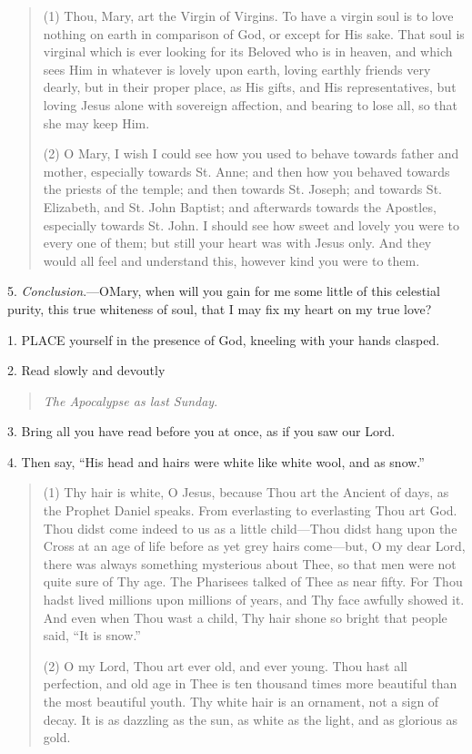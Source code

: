 \begin{quote}

(1) Thou, Mary, art the Virgin
of Virgins. To have a virgin soul is to love nothing on earth in
comparison of God, or except for His sake. That soul is virginal which
is ever looking for its Beloved who is in heaven, and which sees Him
in whatever is lovely upon earth, loving earthly friends very dearly,
but in their proper place, as His gifts, and His representatives, but
loving Jesus alone with sovereign affection, and bearing to lose all,
so that she may keep Him.

(2) O Mary, I wish I could see
how you used to behave towards father and mother, especially towards
St. Anne; and then how you behaved towards the priests of the temple;
and then towards St. Joseph; and towards St. Elizabeth, and St. John
Baptist; and afterwards towards the Apostles, especially towards
St. John. I should see how sweet and lovely you were to every one of
them; but still your heart was with Jesus only. And they would all
feel and understand this, however kind you were to them.

\end{quote}

5. \emph{Conclusion}.—O\emph{}Mary,
when will you gain for me some little of this celestial purity, this
true whiteness of soul, that I may fix my heart on my true love?


1. PLACE
yourself in the presence of God, kneeling with your hands clasped.

2. Read slowly and devoutly

\begin{quote}

\emph{The Apocalypse as last
Sunday}.

\end{quote}

3. Bring all you have read
before you at once, as if you saw our Lord.

4. Then say, ``His head and hairs
were white like white wool, and as snow.''

\begin{quote}

(1) Thy hair is white, O
Jesus, because Thou art the Ancient of days, as the Prophet Daniel
speaks. From everlasting to everlasting Thou art God. Thou didst come
indeed to us as a little child—Thou didst hang upon the Cross at an
age of life before as yet grey hairs come—but, O my dear Lord, there
was always something mysterious about Thee, so that men were not quite
sure of Thy age. The Pharisees talked of Thee as near fifty. For Thou
hadst lived millions upon millions of years, and Thy face awfully
showed it. And even when Thou wast a child, Thy hair shone so bright
that people said, ``It is snow.''

(2) O my Lord, Thou art ever
old, and ever young. Thou hast all perfection, and old age in Thee is
ten thousand times more beautiful than the most beautiful youth. Thy
white hair is an ornament, not a sign of decay. It is as dazzling as
the sun, as white as the light, and as glorious as gold.

\end{quote}


